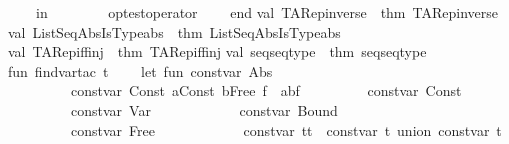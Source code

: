 \begin{isabellebody}
\ \ \ \ in\isanewline
\ \ \ \ \ \ \ \ {\isacharparenleft}op{\isacharunderscore}test{\isacharparenleft}operator{\isacharparenright}{\isacharparenright}\isanewline
\ \ \ \ end\isanewline
{\isacharverbatimclose}\isanewline
\isanewline
\isanewline
{}\isamarkupfalse%
\isanewline
{\isacharverbatimopen}\isanewline
val\ TARep{\isacharunderscore}inverse\ {\isacharequal}\ thm\ {\isachardoublequote}TARep{\isacharunderscore}inverse{\isachardoublequote}\isanewline
val\ ListSeqAbsIsTypeabs\ {\isacharequal}\ thm\ {\isachardoublequote}ListSeqAbsIsTypeabs{\isachardoublequote}\isanewline
val\ TARep{\isacharunderscore}iff{\isacharunderscore}inj\ {\isacharequal}\ thm\ {\isachardoublequote}TARep{\isacharunderscore}iff{\isacharunderscore}inj{\isachardoublequote}\isanewline
val\ seq{\isacharunderscore}seqtype\ {\isacharequal}\ thm\ {\isachardoublequote}seq{\isacharunderscore}seqtype{\isachardoublequote}\isanewline
\isanewline
\isanewline
fun\ find{\isacharunderscore}var{\isacharunderscore}tac\ t\ {\isacharequal}\ \isanewline
\ \ let\ fun\ const{\isacharunderscore}var\ {\isacharparenleft}Abs\ {\isacharunderscore}{\isacharparenright}\ {\isacharequal}\ {\isacharbrackleft}{\isacharbrackright}\isanewline
\ \ \ \ \ \ \ \ {\isacharbar}\ const{\isacharunderscore}var\ {\isacharparenleft}{\isacharparenleft}Const\ a{\isacharparenright}{\isachardollar}{\isacharparenleft}Const\ b{\isacharparenright}{\isachardollar}{\isacharparenleft}Free\ f{\isacharparenright}{\isacharparenright}\ {\isacharequal}\ {\isacharbrackleft}{\isacharparenleft}{\isacharparenleft}a{\isacharcomma}b{\isacharparenright}{\isacharcomma}f{\isacharparenright}{\isacharbrackright}\isanewline
\ \ \ \ \ \ \ \ {\isacharbar}\ const{\isacharunderscore}var\ {\isacharparenleft}Const\ {\isacharunderscore}{\isacharparenright}\ {\isacharequal}\ {\isacharbrackleft}{\isacharbrackright}\isanewline
\ \ \ \ \ \ \ \ {\isacharbar}\ const{\isacharunderscore}var\ {\isacharparenleft}Var\ {\isacharunderscore}{\isacharparenright}\ {\isacharequal}\ {\isacharbrackleft}{\isacharbrackright}\isanewline
\ \ \ \ \ \ \ \ {\isacharbar}\ const{\isacharunderscore}var\ {\isacharparenleft}Bound\ {\isacharunderscore}{\isacharparenright}\ {\isacharequal}\ {\isacharbrackleft}{\isacharbrackright}\isanewline
\ \ \ \ \ \ \ \ {\isacharbar}\ const{\isacharunderscore}var\ {\isacharparenleft}Free\ {\isacharunderscore}{\isacharparenright}\ {\isacharequal}\ {\isacharbrackleft}{\isacharbrackright}\isanewline
\ \ \ \ \ \ \ \ {\isacharbar}\ const{\isacharunderscore}var\ {\isacharparenleft}t{}{\isachardollar}t{}{\isacharparenright}\ {\isacharequal}\ {\isacharparenleft}const{\isacharunderscore}var\ t{}{\isacharparenright}\ union\ {\isacharparenleft}const{\isacharunderscore}var\ t{}{\isacharparenright}\isanewline

\end{isabellebody}
